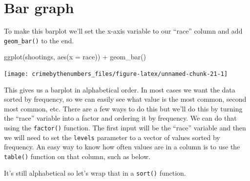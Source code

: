 \documentclass[
]{krantz}
\makeatletter
\newenvironment{Shaded}{\begin{snugshade}}{\end{snugshade}}
\newcommand{\AttributeTok}[1]{\textcolor[rgb]{0.61,0.61,0.61}{#1}}
\newcommand{\CommentTok}[1]{\textcolor[rgb]{0.37,0.37,0.37}{\textit{#1}}}
\newcommand{\FunctionTok}[1]{\textcolor[rgb]{0,0,0}{#1}}
\newcommand{\NormalTok}[1]{#1}
\newcommand{\SpecialCharTok}[1]{\textcolor[rgb]{0,0,0}{#1}}
\newenvironment{kframe}{%
\medskip{}
\setlength{\fboxsep}{.8em}
 \def\at@end@of@kframe{}%
 \ifinner\ifhmode%
  \def\at@end@of@kframe{\end{minipage}}%
  \begin{minipage}{\columnwidth}%
 \fi\fi%
 \def\FrameCommand##1{\hskip\@totalleftmargin \hskip-\fboxsep
 \colorbox{shadecolor}{##1}\hskip-\fboxsep
     \hskip-\linewidth \hskip-\@totalleftmargin \hskip\columnwidth}%
 \MakeFramed {\advance\hsize-\width
   \@totalleftmargin\z@ \linewidth\hsize
   \@setminipage}}%
 {\par\unskip\endMakeFramed%
 \at@end@of@kframe}
\renewenvironment{Shaded}{\begin{kframe}}{\end{kframe}}
\makeatother
\begin{document}
\hypertarget{bar-graph}{%
\section{Bar graph}\label{bar-graph}}

To make this barplot we'll set the x-axis variable to our ``race'' column and add \texttt{geom\_bar()} to the end.

\begin{Shaded}
\begin{Highlighting}[]
\FunctionTok{ggplot}\NormalTok{(shootings, }\FunctionTok{aes}\NormalTok{(}\AttributeTok{x =}\NormalTok{ race)) }\SpecialCharTok{+} 
  \FunctionTok{geom\_bar}\NormalTok{()}
\end{Highlighting}
\end{Shaded}

\begin{center}\texttt{[image: crimebythenumbers\_files/figure-latex/unnamed-chunk-21-1]} \end{center}

This gives us a barplot in alphabetical order. In most cases we want the data sorted by frequency, so we can easily see what value is the most common, second most common, etc. There are a few ways to do this but we'll do this by turning the ``race'' variable into a factor and ordering it by frequency. We can do that using the \texttt{factor()} function. The first input will be the ``race'' variable and then we will need to set the \texttt{levels} parameter to a vector of values sorted by frequency. An easy way to know how often values are in a column is to use the \texttt{table()} function on that column, such as below.

\begin{Shaded}
\end{Shaded}

It's still alphabetical so let's wrap that in a \texttt{sort()} function.

\begin{Shaded}
\end{Shaded}
\end{document}
